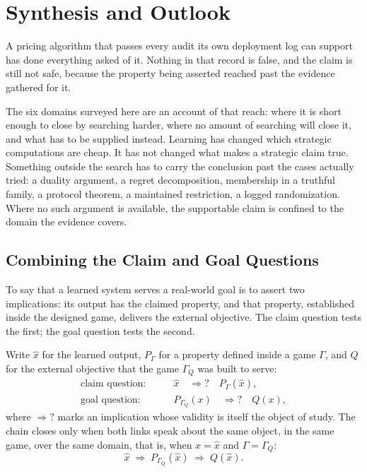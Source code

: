 
\section{Synthesis and Outlook}
\label{sec:synthesis}

A pricing algorithm that passes every audit its own deployment log can support
has done everything asked of it. Nothing in that record is false, and the claim
is still not safe, because the property being asserted reached past the evidence
gathered for it.

The six domains surveyed here are an account of that reach: where it is short enough
to close by searching harder, where no amount of searching will close it, and
what has to be supplied instead. Learning has
changed which strategic computations are cheap. It has not changed what makes a
strategic claim true. Something outside the search has to carry the conclusion past
the cases actually tried: a duality argument, a regret decomposition,
membership in a truthful family, a protocol theorem, a maintained restriction, a
logged randomization. Where no such argument is available, the supportable claim is
confined to the domain the evidence covers.

\subsection{Combining the Claim and Goal Questions}
\label{sec:synthesis:compose}

To say that a learned system serves a real-world goal is to assert two implications:
its output has the claimed property, and that property, established inside the
designed game, delivers the external objective. The claim question tests the first;
the goal question tests the second.

Write $\widehat{x}$ for the learned output, $P_\Gamma$ for a property defined
inside a game $\Gamma$, and $Q$ for the external objective that the game
$\Gamma_Q$ was built to serve:
\[
\begin{aligned}
\text{claim question:}\qquad
&\widehat{x} \quad\Longrightarrow?\quad P_\Gamma(\widehat{x}),\\
\text{goal question:}\qquad
&P_{\Gamma_Q}(x) \quad\Longrightarrow?\quad Q(x),
\end{aligned}
\]
where $\Longrightarrow?$ marks an implication whose validity is itself the object
of study. The chain closes only when both links speak about the same object, in the same game, over the same domain, that is, when $x=\widehat{x}$ and
$\Gamma=\Gamma_Q$:
\[
\widehat{x} \;\Longrightarrow\; P_{\Gamma_Q}(\widehat{x}) \;\Longrightarrow\;
Q(\widehat{x}).
\]

